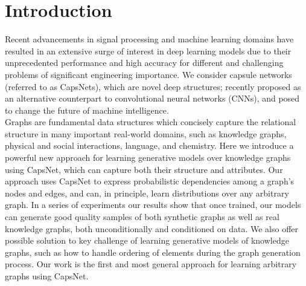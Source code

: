 \section{Introduction}
\label{sec:introduction}
Recent advancements in signal processing and machine learning domains have resulted in an extensive surge of interest in deep learning models due to their unprecedented performance and high accuracy for different and challenging problems of significant engineering importance. We consider capsule networks (referred to as CapsNets), which are novel deep structures; recently proposed as an alternative counterpart to convolutional neural networks (CNNs), and posed to change the future of machine intelligence. \\Graphs are fundamental data structures which concisely capture the relational structure in many important real-world domains, such as knowledge graphs, physical and social interactions, language, and chemistry. Here we introduce a powerful new approach for learning generative models over knowledge graphs using CapsNet, which can capture both their structure and attributes. Our approach uses CapsNet to express probabilistic dependencies among a graph's nodes and edges, and can, in principle, learn distributions over any arbitrary graph. In a series of experiments our results show that once trained, our models can generate good quality samples of both synthetic graphs as well as real knowledge graphs, both unconditionally and conditioned on data. We also offer possible solution to key challenge of learning generative models of knowledge graphs, such as how to handle ordering of elements during the graph generation process. Our work is the first and most general approach for learning arbitrary graphs using CapsNet.